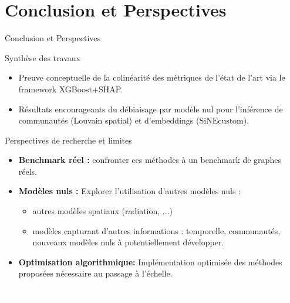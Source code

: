 \documentclass[10pt]{beamer}
\begin{document}
\section{Conclusion et Perspectives}

\begin{frame}{Conclusion et Perspectives}
    \begin{block}{Synthèse des travaux}
        \begin{itemize}
            \item Preuve conceptuelle de la colinéarité des métriques de l'état de l'art via le framework XGBoost+SHAP.
            \item Résultats encourageants du débiaisage par modèle nul pour l'inférence de communautés (Louvain spatial) et d'embeddings ($\text{SiNEcustom}$).
        \end{itemize}
    \end{block}
    \begin{block}{Perspectives de recherche et limites}
        \begin{itemize}
            \item \textbf{Benchmark réel :} confronter ces méthodes à un benchmark de graphes réels.
            \item \textbf{Modèles nuls :} Explorer l'utilisation d'autres modèles nuls :
                \begin{itemize}
                    \item autres modèles spatiaux (radiation, ...)
                    \item modèles capturant d'autres informations : temporelle, communautés, nouveaux modèles nuls à potentiellement développer.
                \end{itemize}
            \item \textbf{Optimisation algorithmique:} Implémentation optimisée des méthodes proposées nécessaire au passage à l'échelle.
        \end{itemize}
    \end{block}
\end{frame}

{
\begin{frame}[plain] %
    \centering
    \vfill
    \Huge \bfseries \textcolor{white}{Place à vos questions}
    \vfill
\end{frame}
}
\end{document}

